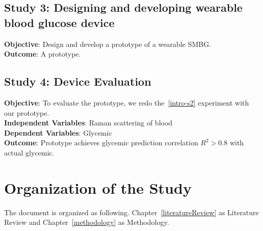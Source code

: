 \subsection{Study 3: Designing and developing wearable blood glucose device}

\textbf{Objective}: Design and develop a prototype of a wearable SMBG.\\
\textbf{Outcome}: A prototype.




\subsection{Study 4: Device Evaluation}

\textbf{Objective}: To evaluate the prototype, we redo the~\ref{intro-s2} experiment with our prototype.\\
\textbf{Independent Variables}: Raman scattering of blood\\
\textbf{Dependent Variables}: Glycemic\\
\textbf{Outcome}: Prototype achieves glycemic prediction correlation $R^2 > 0.8$ with actual glycemic.




\section{Organization of the Study}

The document is organized as following. Chapter~\ref{literatureReview} as Literature Review and Chapter~\ref{methodology} as Methodology.